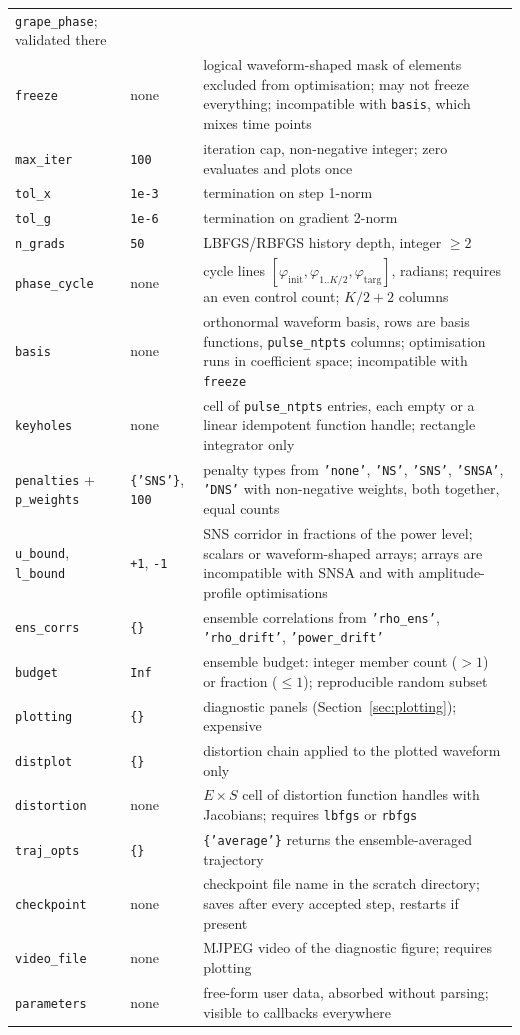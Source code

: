 \documentclass[11pt,a4paper]{article}
\newcommand{\code}[1]{\texttt{#1}}
\begin{document}
\begin{longtable}{lp{2.6cm}p{7.6cm}}
\code{grape\_phase}; validated there\\
\code{freeze} & none & logical waveform-shaped mask of elements
excluded from optimisation; may not freeze everything; incompatible
with \code{basis}, which mixes time points\\
\code{max\_iter} & \code{100} & iteration cap, non-negative integer;
zero evaluates and plots once\\
\code{tol\_x} & \code{1e-3} & termination on step 1-norm\\
\code{tol\_g} & \code{1e-6} & termination on gradient 2-norm\\
\code{n\_grads} & \code{50} & LBFGS/RBFGS history depth, integer
$\geq2$\\
\code{phase\_cycle} & none & cycle lines
$[\varphi_{\mathrm{init}},\varphi_{1..K/2},\varphi_{\mathrm{targ}}]$,
radians; requires an even control count; $K/2+2$ columns\\
\code{basis} & none & orthonormal waveform basis, rows are basis
functions, \code{pulse\_ntpts} columns; optimisation runs in
coefficient space; incompatible with \code{freeze}\\
\code{keyholes} & none & cell of \code{pulse\_ntpts} entries, each
empty or a linear idempotent function handle; rectangle integrator
only\\
\code{penalties} + \code{p\_weights} & \code{\{'SNS'\}}, \code{100} &
penalty types from \code{'none'}, \code{'NS'}, \code{'SNS'},
\code{'SNSA'}, \code{'DNS'} with non-negative weights, both together,
equal counts\\
\code{u\_bound}, \code{l\_bound} & \code{+1}, \code{-1} & SNS
corridor in fractions of the power level; scalars or waveform-shaped
arrays; arrays are incompatible with SNSA and with amplitude-profile
optimisations\\
\code{ens\_corrs} & \code{\{\}} & ensemble correlations from
\code{'rho\_ens'}, \code{'rho\_drift'}, \code{'power\_drift'}\\
\code{budget} & \code{Inf} & ensemble budget: integer member count
($>1$) or fraction ($\leq1$); reproducible random subset\\
\code{plotting} & \code{\{\}} & diagnostic panels
(Section~\ref{sec:plotting}); expensive\\
\code{distplot} & \code{\{\}} & distortion chain applied to the
plotted waveform only\\
\code{distortion} & none & $E\times S$ cell of distortion function
handles with Jacobians; requires \code{lbfgs} or \code{rbfgs}\\
\code{traj\_opts} & \code{\{\}} & \code{\{'average'\}} returns the
ensemble-averaged trajectory\\
\code{checkpoint} & none & checkpoint file name in the scratch
directory; saves after every accepted step, restarts if present\\
\code{video\_file} & none & MJPEG video of the diagnostic figure;
requires plotting\\
\code{parameters} & none & free-form user data, absorbed without
parsing; visible to callbacks everywhere\\
\bottomrule
\end{longtable}
\end{document}
